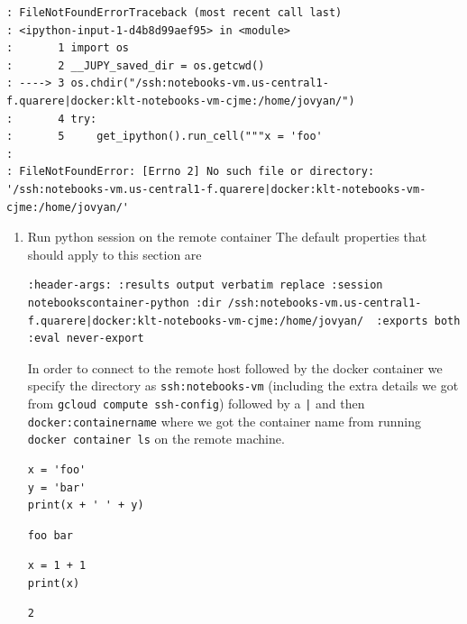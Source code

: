 \documentclass[11pt]{article}
\begin{document}
\begin{verbatim}
: FileNotFoundErrorTraceback (most recent call last)
: <ipython-input-1-d4b8d99aef95> in <module>
:       1 import os
:       2 __JUPY_saved_dir = os.getcwd()
: ----> 3 os.chdir("/ssh:notebooks-vm.us-central1-f.quarere|docker:klt-notebooks-vm-cjme:/home/jovyan/")
:       4 try:
:       5     get_ipython().run_cell("""x = 'foo'
:
: FileNotFoundError: [Errno 2] No such file or directory: '/ssh:notebooks-vm.us-central1-f.quarere|docker:klt-notebooks-vm-cjme:/home/jovyan/'
\end{verbatim}

\begin{enumerate}
\item Run python session on the remote container
\label{sec:org8310c06}
The default properties that should apply to this section are

\begin{verbatim}
:header-args: :results output verbatim replace :session notebookscontainer-python :dir /ssh:notebooks-vm.us-central1-f.quarere|docker:klt-notebooks-vm-cjme:/home/jovyan/  :exports both  :eval never-export
\end{verbatim}

In order to connect to the remote host followed by the docker container we specify the directory as \texttt{ssh:notebooks-vm} (including the extra details we got from \texttt{gcloud compute ssh-config}) followed by a \texttt{|} and then \texttt{docker:containername} where we got the container name from running \texttt{docker container ls} on the remote machine.

\begin{verbatim}
x = 'foo'
y = 'bar'
print(x + ' ' + y)
\end{verbatim}

\begin{verbatim}
foo bar
\end{verbatim}


\begin{verbatim}
x = 1 + 1
print(x)
\end{verbatim}

\begin{verbatim}
2
\end{verbatim}
\end{enumerate}
\end{document}
